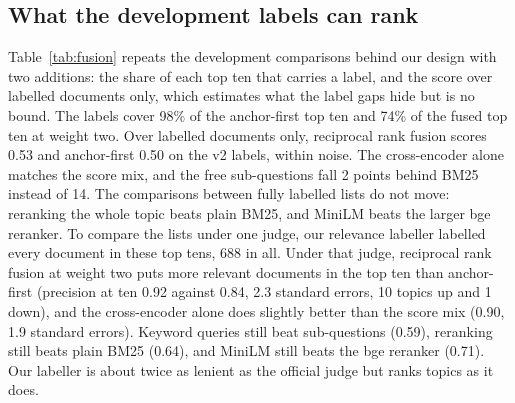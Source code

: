 \documentclass[sigconf,nonacm]{acmart}
\begin{document}
\subsection{What the development labels can rank}
\label{sec:dev-labels}
Table~\ref{tab:fusion} repeats the development comparisons behind our design with
two additions: the share of each top ten that carries a label, and the score over
labelled documents only, which estimates what the label gaps hide but is no bound.
The labels cover 98\% of the anchor-first top ten and 74\% of the fused top ten at
weight two. Over labelled documents only, reciprocal rank fusion scores 0.53 and
anchor-first 0.50 on the v2 labels, within noise. The cross-encoder alone matches the
score mix, and the free sub-questions fall 2 points behind BM25 instead of 14. The
comparisons between fully labelled lists do not move: reranking the whole topic
beats plain BM25, and MiniLM beats the larger bge reranker.
To compare the lists under one judge, our relevance labeller labelled every
document in these top tens, 688 in all. Under that judge, reciprocal rank fusion
at weight two puts more relevant documents in the top ten than anchor-first
(precision at ten 0.92 against 0.84, 2.3 standard errors, 10 topics up and 1 down),
and the cross-encoder alone does slightly better than the score mix (0.90, 1.9
standard errors). Keyword queries still beat sub-questions (0.59), reranking still
beats plain BM25 (0.64), and MiniLM still beats the bge reranker (0.71). Our labeller
is about twice as lenient as the official judge but ranks topics as it does.
\end{document}

